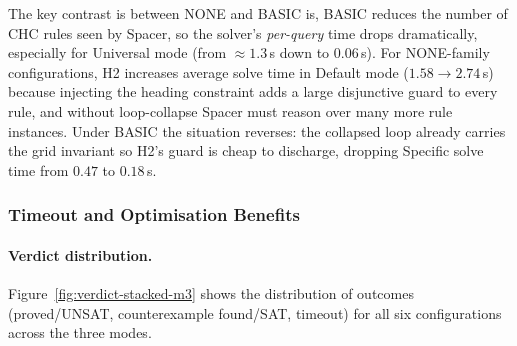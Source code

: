 The key contrast is between NONE and BASIC is, BASIC reduces the number of CHC rules
seen by Spacer, so the solver's \emph{per-query} time drops dramatically,
especially for Universal mode (from $\approx 1.3$\,s down to $0.06$\,s).
For NONE-family configurations, H2 increases average solve time in Default mode
($1.58 \to 2.74$\,s) because injecting the heading constraint adds a large
disjunctive guard to every rule, and without loop-collapse Spacer must reason
over many more rule instances.  Under BASIC the situation reverses: the collapsed
loop already carries the grid invariant so H2's guard is cheap to discharge,
dropping Specific solve time from $0.47$ to $0.18$\,s.

\subsubsection*{Timeout and Optimisation Benefits}

\paragraph{Verdict distribution.}
Figure~\ref{fig:verdict-stacked-m3} shows the distribution of outcomes
(proved/UNSAT, counterexample found/SAT, timeout) for all six configurations
across the three modes.

